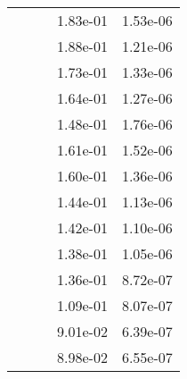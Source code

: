 \begin{table}
\begin{tabular}{c|cc|cc|}
\multicolumn{1}{|c|}{} & \multicolumn{1}{|c|}{} & \multicolumn{1}{|c|}{} & \multicolumn{1}{|c|}{  1.83e-01} & \multicolumn{1}{|c|}{  1.53e-06} \\ 
\multicolumn{1}{|c|}{} & \multicolumn{1}{|c|}{} & \multicolumn{1}{|c|}{} & \multicolumn{1}{|c|}{  1.88e-01} & \multicolumn{1}{|c|}{  1.21e-06} \\ 
\multicolumn{1}{|c|}{} & \multicolumn{1}{|c|}{} & \multicolumn{1}{|c|}{} & \multicolumn{1}{|c|}{  1.73e-01} & \multicolumn{1}{|c|}{  1.33e-06} \\ 
\multicolumn{1}{|c|}{} & \multicolumn{1}{|c|}{} & \multicolumn{1}{|c|}{} & \multicolumn{1}{|c|}{  1.64e-01} & \multicolumn{1}{|c|}{  1.27e-06} \\ 
\multicolumn{1}{|c|}{} & \multicolumn{1}{|c|}{} & \multicolumn{1}{|c|}{} & \multicolumn{1}{|c|}{  1.48e-01} & \multicolumn{1}{|c|}{  1.76e-06} \\ 
\multicolumn{1}{|c|}{} & \multicolumn{1}{|c|}{} & \multicolumn{1}{|c|}{} & \multicolumn{1}{|c|}{  1.61e-01} & \multicolumn{1}{|c|}{  1.52e-06} \\ 
\multicolumn{1}{|c|}{} & \multicolumn{1}{|c|}{} & \multicolumn{1}{|c|}{} & \multicolumn{1}{|c|}{  1.60e-01} & \multicolumn{1}{|c|}{  1.36e-06} \\ 
\multicolumn{1}{|c|}{} & \multicolumn{1}{|c|}{} & \multicolumn{1}{|c|}{} & \multicolumn{1}{|c|}{  1.44e-01} & \multicolumn{1}{|c|}{  1.13e-06} \\ 
\multicolumn{1}{|c|}{} & \multicolumn{1}{|c|}{} & \multicolumn{1}{|c|}{} & \multicolumn{1}{|c|}{  1.42e-01} & \multicolumn{1}{|c|}{  1.10e-06} \\ 
\multicolumn{1}{|c|}{} & \multicolumn{1}{|c|}{} & \multicolumn{1}{|c|}{} & \multicolumn{1}{|c|}{  1.38e-01} & \multicolumn{1}{|c|}{  1.05e-06} \\ 
\multicolumn{1}{|c|}{} & \multicolumn{1}{|c|}{} & \multicolumn{1}{|c|}{} & \multicolumn{1}{|c|}{  1.36e-01} & \multicolumn{1}{|c|}{  8.72e-07} \\ 
\multicolumn{1}{|c|}{} & \multicolumn{1}{|c|}{} & \multicolumn{1}{|c|}{} & \multicolumn{1}{|c|}{  1.09e-01} & \multicolumn{1}{|c|}{  8.07e-07} \\ 
\multicolumn{1}{|c|}{} & \multicolumn{1}{|c|}{} & \multicolumn{1}{|c|}{} & \multicolumn{1}{|c|}{  9.01e-02} & \multicolumn{1}{|c|}{  6.39e-07} \\ 
\multicolumn{1}{|c|}{} & \multicolumn{1}{|c|}{} & \multicolumn{1}{|c|}{} & \multicolumn{1}{|c|}{  8.98e-02} & \multicolumn{1}{|c|}{  6.55e-07} \\ 

\end{tabular}
\end{table}
